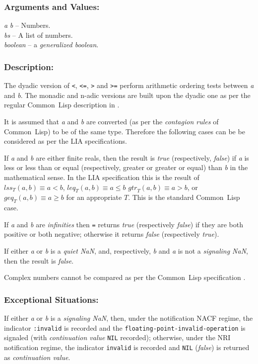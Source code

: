 \documentclass[10pt,fleqn]{article}
\newcommand{\CL}{\textsf{Common~Lisp}}
\newcommand{\code}[1]{\texttt{#1}}
\newcommand{\clieeeterm}[1]{\textit{#1}}
\newcommand{\varname}[1]{\textit{#1}}
\newcommand{\clterm}[1]{\textit{#1}}
\newcommand{\DArgsNValues}{\subsubsection*{Arguments and Values:}}
\newcommand{\DDescription}{\subsubsection*{Description:}}
\newcommand{\DExceptional}{\subsubsection*{Exceptional Situations:}}
\begin{document}
\DArgsNValues{}

\varname{a} \varname{b} -- Numbers.\\
\varname{bs} -- A list of numbers.\\
\varname{boolean} -- a \clterm{generalized boolean}.

\DDescription{}

The dyadic version of \code{<}, \code{<=}, \code{>} and \code{>=}
perform arithmetic ordering tests between \varname{a} and
\varname{b}.  The monadic and n-adic versions are built upon the
dyadic one as per the regular \CL{} description in
\cite{1996:ANSIHyperSpec}.

It is assumed that \varname{a} and \varname{b} are converted (as per
the \emph{contagion rules} of \CL{}) to be of the same type.
Therefore the following cases can be be considered as per the LIA
specifications.

\begin{description}
\item If \varname{a} and \varname{b} are either finite reals, then the result is
\varname{true} (respectively, \varname{false}) if \varname{a} is
less or less than or equal (respectively, greater or greater or equal)
than \varname{b} in the mathematical sense.  In the
LIA specification this is the result of
$\mathit{lss}_T(a, b) \equiv a < b$,
$\mathit{leq}_T(a, b) \equiv a \leq b$
$\mathit{gtr}_T(a, b) \equiv a > b$, or
$\mathit{geq}_T(a, b) \equiv a \geq b$
for an
appropriate $T$.  This is the standard \CL{} case.

\item If \varname {a} and \varname {b} are \clieeeterm{infinities} then
\code{=} returns \varname{true} (respectively \varname{false}) if they
are both positive or both negative; otherwise it returns
\varname{false} (respectively \varname{true}).

\item If either \varname {a} or \varname {b} is a \clieeeterm{quiet NaN},
and, respectively, \varname {b} and \varname {a} is not a
\clieeeterm{signaling NaN}, then the result is \varname{false}.

\item Complex numbers cannot be compared as per the \CL{}
  specification \cite{1996:ANSIHyperSpec}.
\end{description}

\DExceptional{}

If either \varname {a} or \varname {b} is a \clieeeterm{signaling
  NaN}, then, under the notification NACF regime, the indicator
\code{:invalid} is recorded and the
\code{floating-point-invalid-operation} is signaled (with
\emph{continuation value} \code{NIL} recorded); otherwise, under the
NRI notification regime, the indicator \code{invalid} is recorded and
\code{NIL} (\varname{false}) is returned as \emph{continuation value}.
\end{document}

